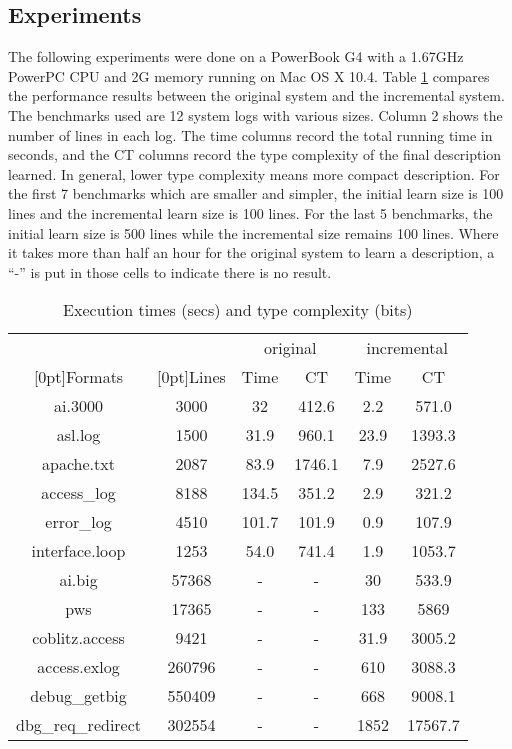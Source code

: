 \subsection{Experiments}
The following experiments were done on a PowerBook G4 with a 1.67GHz PowerPC
CPU and 2G memory running on Mac OS X 10.4. 
Table \ref{tab:results} compares the performance results between
the original \learnpads{} system and the incremental system. 
The benchmarks used are 12 system logs with various sizes. Column 2
shows the number of lines in each log. The time columns record the total
running time in seconds, and the CT columns record the type complexity
of the final description learned. In general, lower type complexity means
more compact description. For the first 7 benchmarks which are smaller
and simpler, the initial learn size is 100 lines and the 
incremental learn size is 100 lines. For the last 5 benchmarks, 
the initial learn size is 500 lines while the incremental size remains
100 lines. Where it takes more than half an hour for the original \learnpads{}
system to learn a description, a ``-'' is put in those cells to 
indicate there is no result.

\begin{table}[th]
\begin{tabular}{|c|c|c|c|c|c|}\hline
& & \multicolumn{2}{|c|}{original} & \multicolumn{2}{|c|}{incremental} \\ \cline{3-6}
\raisebox{1.5ex}[0pt]{Formats} & \raisebox{1.5ex}[0pt]{Lines} &
	Time & CT & Time & CT \\ \hline \hline
ai.3000	&	3000	& 32	& 412.6	& 2.2	& 571.0	\\ \hline
asl.log  &	1500	& 31.9	& 960.1	& 23.9 	& 1393.3 \\ \hline
apache.txt  &	2087	& 83.9 & 1746.1 & 7.9 	& 2527.6 \\ \hline
access\_log  &	8188 	& 134.5	& 351.2	& 2.9	& 321.2	\\ \hline
error\_log  &	4510	& 101.7	& 101.9	& 0.9	& 107.9 \\ \hline
interface.loop & 1253	& 54.0	& 741.4	& 1.9	& 1053.7 \\ \hline
ai.big	&	57368	& -	& -	& 30	& 533.9 \\ \hline
pws	&	 17365	& -	& - 	& 133  & 5869 \\ \hline
coblitz.access & 9421   & -	& -	& 31.9 & 3005.2 \\ \hline
access.exlog & 260796 	& -	& -	& 610 & 3088.3 \\ \hline
debug\_getbig & 550409   & -	& -	& 668 & 9008.1 \\ \hline
dbg\_req\_redirect & 302554 & -	& -	& 1852 & 17567.7 \\ \hline
\end{tabular}
\caption{Execution times (secs) and type complexity (bits)} 
\label{tab:results}
\end{table}


